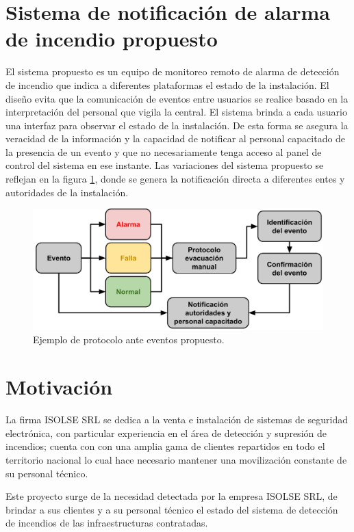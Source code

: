 \section{Sistema de notificación de alarma de incendio propuesto}

El sistema propuesto es un equipo de monitoreo remoto de alarma de detección de incendio que indica a diferentes plataformas el estado de la instalación. El diseño evita que la comunicación de eventos entre usuarios se realice basado en la interpretación del personal que vigila la central. El sistema brinda a cada usuario  una interfaz para observar el estado de la instalación. De esta forma se asegura la veracidad de la información y la capacidad de notificar al personal capacitado de la presencia de un evento y que no necesariamente tenga acceso al panel de control del sistema en ese instante. Las variaciones del sistema propuesto se reflejan en la figura \ref{fig:figura_a3}, donde se genera la notificación directa a diferentes entes y autoridades de la instalación.  

\begin{figure}[h]
	\centering
	\includegraphics[scale=.35]{./Figures/Capitulo1/FIG_C1.png}
	\caption{Ejemplo de protocolo ante eventos propuesto.}
	\label{fig:figura_a3}
\end{figure}

\section{Motivación}

La firma ISOLSE SRL se dedica a la venta e instalación de sistemas de seguridad electrónica, con particular experiencia en el área de detección y supresión de incendios; cuenta con con una amplia gama de clientes repartidos en todo el territorio nacional lo cual hace necesario mantener una movilización constante de su personal técnico. 

Este proyecto surge de la necesidad detectada por la empresa ISOLSE SRL, de brindar a sus clientes y a su personal técnico el estado del sistema de detección de incendios de las infraestructuras contratadas.

